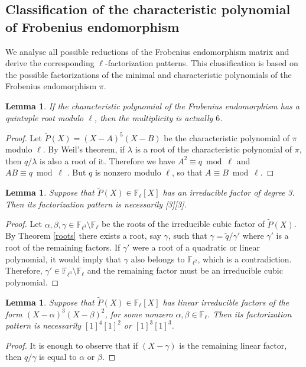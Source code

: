 \documentclass[11pt,a4paper]{article}
\theoremstyle{plain}
\newtheorem{lemma}[theorem]{Lemma}
\theoremstyle{definition}
\theoremstyle{remark}
\begin{document}
\subsection{Classification of the characteristic polynomial of Frobenius endomorphism}
 We analyse all possible reductions of the Frobenius endomorphism matrix and derive the corresponding $\ell$-factorization patterns. This classification is based on the possible factorizations of the minimal and characteristic polynomials of the Frobenius endomorphism $\pi$.
\begin{lemma}
If the characteristic polynomial of the Frobenius endomorphism has a quintuple root modulo \(\ell\),
then the multiplicity is actually \(6\).
\end{lemma}
\begin{proof}
 Let  $\widetilde{P}(X)=(X-A)^5(X-B)$ be the characteristic polynomial of $\pi$ modulo $\ell$. By Weil's theorem, if $\lambda$ is a root of the characteristic polynomial of $\pi$, then $q/\lambda$ is also a
root of it. Therefore we have $A^2 \equiv q \bmod{\ell}$ and $AB \equiv q \bmod{\ell}$ . But $q$ is nonzero
modulo $\ell$, so that $A \equiv B \bmod{\ell}$.
\end{proof} 

\begin{lemma}
Suppose that $\tilde{P}(X)\in\mathbb{F}_{\ell}[X] $ has an irreducible factor of degree 3. Then its  factorization pattern is necessarily [3][3].
\end{lemma}
\begin{proof}
Let $\alpha,\beta,\gamma\in\mathbb{F}_{\ell^3}\setminus\mathbb{F}_{\ell}$ be the roots of the irreducible cubic factor of $\tilde{P}(X)$. By  Theorem \ref{roots} there exists a root, say $\gamma$, such that $\gamma=\tilde{q}/\gamma'$ where $\gamma'$ is a root of the remaining factors. If $\gamma'$ were a root of a quadratic or linear polynomial, it would imply that $\gamma$ also belongs to $\mathbb{F}_{\ell^2}$, which is a contradiction. Therefore, $\gamma'\in\mathbb{F}_{\ell^3}\setminus\mathbb{F}_{\ell}$ and the remaining factor must be an irreducible cubic polynomial.  
\end{proof}

\begin{lemma}
Suppose that $\tilde{P}(X)\in\mathbb{F}_{\ell}[X] $ has linear irreducible factors of the form $(X-\alpha)^3(X-\beta)^2$, for some nonzero $\alpha,\beta\in\mathbb{F}_{\ell}$. Then its factorization pattern is necessarily  $[1]^4[1]^2$ or $[1]^3[1]^3$.
\end{lemma}
\begin{proof}
It is enough to observe that if $(X-\gamma)$ is the remaining linear factor, then $q/\gamma$ is equal to $\alpha$ or $\beta$. 
\end{proof}
\end{document}
